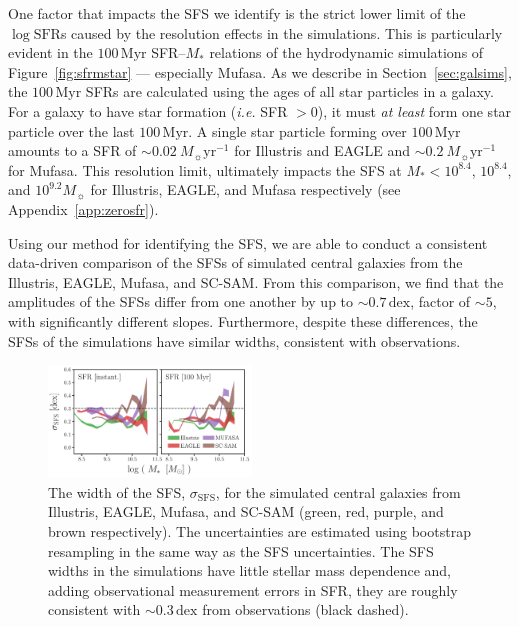 \documentclass[tighten, preprint]{aastex62}
\begin{document}
One factor that impacts the SFS we identify is the strict lower limit of the 
$\log\mathrm{SFR}$s caused by the resolution effects in the simulations. 
This is particularly evident in the $100\,\mathrm{Myr}$ SFR--$M_*$ 
relations of the hydrodynamic simulations of Figure~\ref{fig:sfrmstar} --- especially 
{\sc Mufasa}. As we describe in Section~\ref{sec:galsims}, the $100\,\mathrm{Myr}$ 
SFRs are  calculated using the ages of all star particles in a galaxy. For a galaxy to 
have star formation (\emph{i.e.} SFR $> 0$), it must \emph{at least} 
form one star particle over the last $100\,\mathrm{Myr}$. A single star particle 
forming over $100\,\mathrm{Myr}$ amounts to a SFR of 
${\sim}0.02\ M_{\sun} \mathrm{yr}^{-1}$ for Illustris and EAGLE and
${\sim}0.2\ M_{\sun} \mathrm{yr}^{-1}$ for {\sc Mufasa}. This resolution limit, ultimately 
impacts the SFS at $M_*{<}10^{8.4}$, $10^{8.4}$, and 
$10^{9.2}M_\sun$ for Illustris, EAGLE, and {\sc Mufasa} respectively (see Appendix~\ref{app:zerosfr}). 

Using our method for identifying the SFS, we are able to 
conduct a consistent data-driven comparison of the SFSs of simulated 
central galaxies from the Illustris, EAGLE, {\sc Mufasa}, and SC-SAM. From 
this comparison, we find that the amplitudes of the SFSs differ from one 
another by up to ${\sim}0.7\,\mathrm{dex}$, factor of ${\sim}5$, 
with significantly different slopes. Furthermore, despite these differences, the SFSs of 
the simulations have similar widths, consistent with observations. 
\begin{figure}
\begin{center}
\includegraphics[width=0.48\textwidth]{Catalogs_SFMS_width.pdf}
\caption{The width of the SFS, $\sigma_\mathrm{SFS}$, for the simulated 
    central galaxies from Illustris, EAGLE, {\sc Mufasa}, and SC-SAM 
    (green, red, purple, and brown respectively). The uncertainties are 
    estimated using bootstrap resampling in the same way as the SFS uncertainties. 
    The SFS widths in the simulations have little stellar mass 
    dependence and, adding observational measurement errors in SFR, 
    they are roughly consistent with ${\sim}0.3\,\mathrm{dex}$ 
    from observations (black dashed).} \label{fig:sfms_width}
\end{center}
\end{figure}
\end{document}
